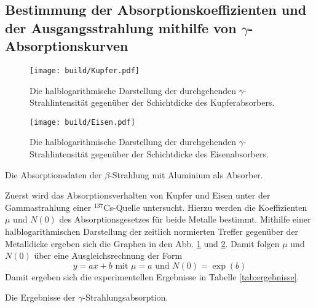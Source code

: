 \subsection{\texorpdfstring{Bestimmung der Absorptionskoeffizienten und der Ausgangsstrahlung mithilfe von $\gamma$-Absorptionskurven}{}}

\begin{figure}
 \centering
 \caption{Die halblogarithmische Darstellung der durchgehenden $\gamma$-Strahlintensität gegenüber der Schichtdicke des Kupferabsorbers.}
 \texttt{[image: build/Kupfer.pdf]}
 \label{fig:kupfer}
\end{figure}

\begin{figure}
 \centering
 \caption{Die halblogarithmische Darstellung der durchgehenden $\gamma$-Strahlintensität gegenüber der Schichtdicke des Eisenabsorbers.}
 \texttt{[image: build/Eisen.pdf]}
 \label{fig:eisen}
\end{figure}

\begin{table}
 \centering
 \caption{Die Absorptionsdaten der $\beta$-Strahlung mit Aluminium als Absorber.}
 
 \label{tab:betaJ}
\end{table}

Zuerst wird das Absorptionsverhalten von Kupfer und Eisen unter der Gammastrahlung einer $^{137}$Cs-Quelle untersucht. Hierzu werden die Koeffizienten $\mu$ und $N(0)$ des Absorptionsgesetzes für beide Metalle bestimmt. Mithilfe einer halblogarithmischen Darstellung der zeitlich normierten Treffer gegenüber der Metalldicke ergeben sich die Graphen in  den Abb. \ref{fig:kupfer} und \ref{fig:eisen}. Damit folgen $\mu$ und $N(0)$ über eine Ausgleichsrechnung der Form
\begin{equation}
y = a x+ b \text{ mit } \mu = a \text{ und } N(0) = \exp(b)
\end{equation} Damit ergeben sich die experimentellen Ergebnisse in Tabelle \ref{tab:ergebnisse}.

\begin{table}
 \centering
 \caption{Die Ergebnisse der $\gamma$-Strahlungsabsorption.}
 
 \label{tab:erg1}
\end{table}

